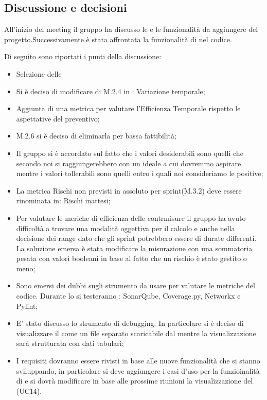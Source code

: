 \subsection{Discussione e decisioni}
\par All'inizio del meeting il gruppo ha discusso le  e le funzionalità da aggiungere del progetto.Successivamente è stata affrontata la funzionalità di  nel codice.
\par Di seguito sono riportati i punti della discussione:
\begin{itemize}
	\item Selezione delle 
	\item Si è deciso di modificare di M.2.4 in : Variazione temporale;
	\item Aggiunta di una metrica per valutare l'Efficienza Temporale rispetto le aspettative del preventivo;
	\item M.2.6 si è deciso di eliminarla per bassa fattibilità;
	\item Il gruppo si è accordato sul fatto che i valori desiderabili sono quelli che secondo noi si raggiungerebbero con un  ideale a cui dovremmo aspirare mentre i valori tollerabili sono quelli entro i quali noi consideriamo le  positive;
	\item La metrica Rischi non previsti in assoluto per sprint(M.3.2) deve essere rinominata in: Rischi inattesi;
	\item Per valutare le meriche di efficienza delle contrmisure il gruppo ha avuto difficoltà a trovare una modalità oggettiva per il calcolo e anche nella decisione dei range dato che gli sprint potrebbero essere di durate differenti. La soluzione emersa è stata modificare la misurazione con una sommatoria pesata con valori booleani in base al fatto che un rischio è stato gestito o meno;
	\item Sono emersi dei dubbi sugli strumento da usare per valutare le metriche del codice. Durante lo  si testeranno : SonarQube, Coverage.py, Networkx e Pylint;
	\item E' stato discusso lo strumento di debugging. In particolare si è deciso di visualizzare il  come un file separato scaricabile dal  mentre la visualizzazione sarà strutturata con dati tabulari;
	\item I requisiti dovranno essere rivisti in base alle nuove funzionalità che si stanno sviluppando, in particolare si deve aggiungere i casi d'uso per la funzioinalità di  e si dovrà modificare in base alle prossime riunioni la visualizzazione del (UC14).
\end{itemize}

